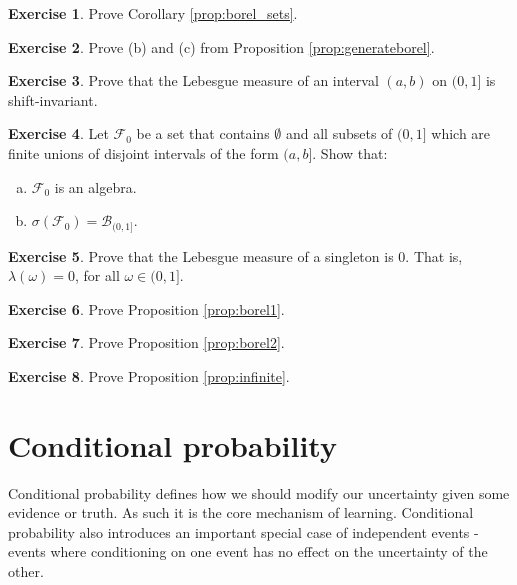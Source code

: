 \documentclass{book}
\theoremstyle{plain}%
\theoremstyle{definition}
\newtheorem{exercise}{Exercise}[chapter]
\begin{document}
\begin{exercise}
Prove Corollary \ref{prop:borel_sets}.
\end{exercise}

\begin{exercise}
Prove (b) and (c) from Proposition \ref{prop:generateborel}.
\end{exercise}

\begin{exercise}
Prove that the Lebesgue measure of an interval $(a,b)$ on $(0,1]$ is shift-invariant.
\end{exercise}

\begin{exercise}
Let $\mathcal{F}_0$ be a set that contains $\emptyset$ and all subsets of $(0,1]$ which are finite unions of disjoint intervals of the form $(a, b]$. Show that:

\begin{enumerate}[(a)]
\item $\mathcal{F}_0$ is an algebra.
\item $\sigma(\mathcal{F}_0) = \mathcal{B}_{(0,1]}$.
\end{enumerate}
\end{exercise}

\begin{exercise}
Prove that the Lebesgue measure of a singleton is 0. That is, $\lambda(\omega) = 0$, for all $\omega \in (0,1]$.
\end{exercise}

\begin{exercise}
Prove Proposition \ref{prop:borel1}.
\end{exercise}

\begin{exercise}
Prove Proposition \ref{prop:borel2}.
\end{exercise}

\begin{exercise}
Prove Proposition \ref{prop:infinite}.
\end{exercise}

\chapter{Conditional probability}

Conditional probability defines how we should modify our uncertainty given some evidence or truth. As such it is the core mechanism of learning. Conditional probability also introduces an important special case of independent events - events where conditioning on one event has no effect on the uncertainty of the other.
\end{document}
